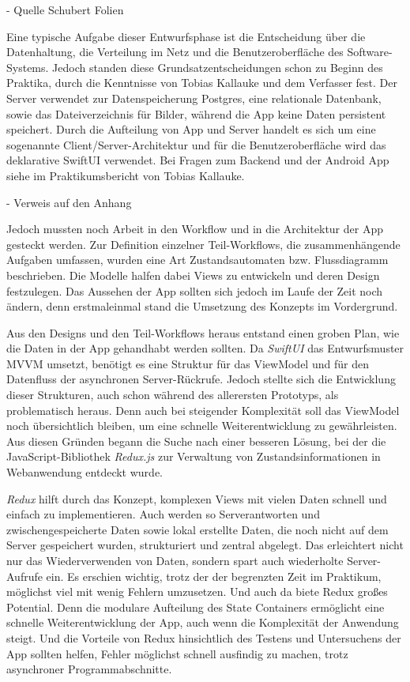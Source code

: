 \documentclass[nomenclature, oneside, 150]{HSMW-Thesis}
\begin{document}
		- Quelle Schubert Folien
		
		Eine typische Aufgabe dieser Entwurfsphase ist die Entscheidung über die Datenhaltung, die Verteilung im Netz und die Benutzeroberfläche des Software-Systems. Jedoch standen diese Grundsatzentscheidungen schon zu Beginn des Praktika, durch die Kenntnisse von Tobias Kallauke und dem Verfasser fest. Der Server verwendet zur Datenspeicherung Postgres, eine relationale Datenbank, sowie das Dateiverzeichnis für Bilder, während die App keine Daten persistent speichert. Durch die Aufteilung von App und Server handelt es sich um eine sogenannte Client/Server-Architektur und für die Benutzeroberfläche wird das deklarative SwiftUI verwendet. Bei Fragen zum Backend und der Android App siehe im Praktikumsbericht von Tobias Kallauke.
		
		- Verweis auf den Anhang
		
		Jedoch mussten noch Arbeit in den Workflow und in die Architektur der App gesteckt werden. Zur Definition einzelner Teil-Workflows, die zusammenhängende Aufgaben umfassen, wurden eine Art Zustandsautomaten bzw. Flussdiagramm beschrieben. Die Modelle halfen dabei Views zu entwickeln und deren Design festzulegen. Das Aussehen der App sollten sich jedoch im Laufe der Zeit noch ändern, denn erstmaleinmal stand die Umsetzung des Konzepts im Vordergrund.

		Aus den Designs und den Teil-Workflows heraus entstand einen groben Plan, wie die Daten in der App gehandhabt werden sollten. Da \textit{SwiftUI} das Entwurfsmuster MVVM umsetzt, benötigt es eine Struktur für das ViewModel und für den Datenfluss der asynchronen Server-Rückrufe. Jedoch stellte sich die Entwicklung dieser Strukturen, auch schon während des allerersten Prototyps, als problematisch heraus. Denn auch bei steigender Komplexität soll das ViewModel noch übersichtlich bleiben, um eine schnelle Weiterentwicklung zu gewährleisten. Aus diesen Gründen begann die Suche nach einer besseren Lösung, bei der die JavaScript-Bibliothek \textit{Redux.js} zur Verwaltung von Zustandsinformationen in Webanwendung entdeckt wurde. 
		
		\textit{Redux} hilft durch das Konzept, komplexen Views mit vielen Daten schnell und einfach zu implementieren. Auch werden so Serverantworten und zwischengespeicherte Daten sowie lokal erstellte Daten, die noch nicht auf dem Server gespeichert wurden, strukturiert und zentral abgelegt. Das erleichtert nicht nur das Wiederverwenden von Daten, sondern spart auch wiederholte Server-Aufrufe ein. Es erschien wichtig, trotz der der begrenzten Zeit im Praktikum, möglichst viel mit wenig Fehlern umzusetzen. Und auch da biete Redux großes Potential. Denn die modulare Aufteilung des State Containers ermöglicht eine schnelle Weiterentwicklung der App, auch wenn die Komplexität der Anwendung steigt. Und die Vorteile von Redux hinsichtlich des Testens und Untersuchens der App sollten helfen, Fehler möglichst schnell ausfindig zu machen, trotz asynchroner Programmabschnitte.
		
\end{document}
